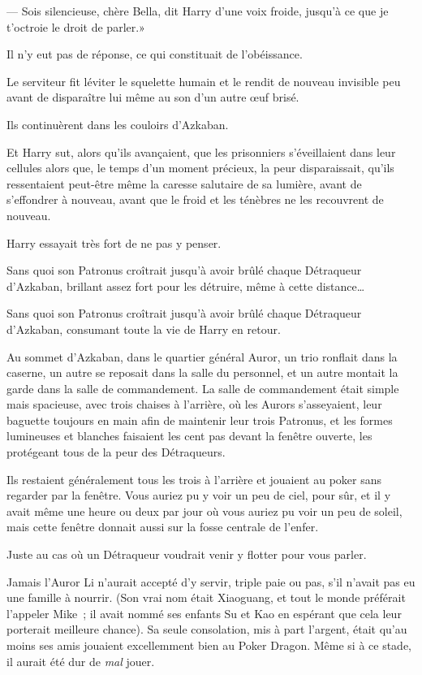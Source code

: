 --- Sois silencieuse, chère Bella, dit Harry d'une voix froide, jusqu'à ce que je t'octroie le droit de parler.»

Il n'y eut pas de réponse, ce qui constituait de l'obéissance.

Le serviteur fit léviter le squelette humain et le rendit de nouveau invisible peu avant de disparaître lui même au son d'un autre œuf brisé.

Ils continuèrent dans les couloirs d'Azkaban.

Et Harry sut, alors qu'ils avançaient, que les prisonniers s'éveillaient dans leur cellules alors que, le temps d'un moment précieux, la peur disparaissait, qu'ils ressentaient peut-être même la caresse salutaire de sa lumière, avant de s'effondrer à nouveau, avant que le froid et les ténèbres ne les recouvrent de nouveau.

Harry essayait très fort de ne pas y penser.

Sans quoi son Patronus croîtrait jusqu'à avoir brûlé chaque Détraqueur d'Azkaban, brillant assez fort pour les détruire, même à cette distance…

Sans quoi son Patronus croîtrait jusqu'à avoir brûlé chaque Détraqueur d'Azkaban, consumant toute la vie de Harry en retour.

\later

Au sommet d'Azkaban, dans le quartier général Auror, un trio ronflait dans la caserne, un autre se reposait dans la salle du personnel, et un autre montait la garde dans la salle de commandement. La salle de commandement était simple mais spacieuse, avec trois chaises à l'arrière, où les Aurors s'asseyaient, leur baguette toujours en main afin de maintenir leur trois Patronus, et les formes lumineuses et blanches faisaient les cent pas devant la fenêtre ouverte, les protégeant tous de la peur des Détraqueurs.

Ils restaient généralement tous les trois à l'arrière et jouaient au poker sans regarder par la fenêtre. Vous auriez pu y voir un peu de ciel, pour sûr, et il y avait même une heure ou deux par jour où vous auriez pu voir un peu de soleil, mais cette fenêtre donnait aussi sur la fosse centrale de l'enfer.

Juste au cas où un Détraqueur voudrait venir y flotter pour vous parler.

Jamais l'Auror Li n'aurait accepté d'y servir, triple paie ou pas, s'il n'avait pas eu une famille à nourrir. (Son vrai nom était Xiaoguang, et tout le monde préférait l'appeler Mike~; il avait nommé ses enfants Su et Kao en espérant que cela leur porterait meilleure chance). Sa seule consolation, mis à part l'argent, était qu'au moins ses amis jouaient excellemment bien au Poker Dragon. Même si à ce stade, il aurait été dur de \emph{mal} jouer.

